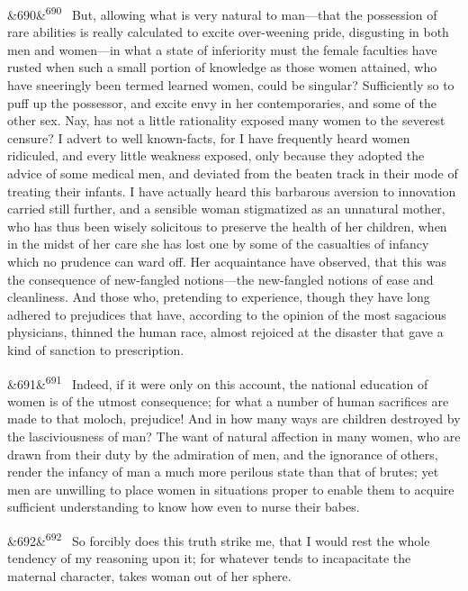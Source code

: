 \documentclass[12pt]{article}
\newcommand{\para}[1][]{\par\noindent\ifx&#1&\else\textsuperscript{\footnotesize #1}~\fi}
\begin{document}
\para[690] But, allowing what is very natural to man---that the possession of rare abilities is really calculated to excite over-weening pride, disgusting in both men and women---in what a state of inferiority must the female faculties have rusted when such a small portion of knowledge as those women attained, who have sneeringly been termed learned women, could be singular? Sufficiently so to puff up the possessor, and excite envy in her contemporaries, and some of the other sex. Nay, has not a little rationality exposed many women to the severest censure? I advert to well known-facts, for I have frequently heard women ridiculed, and every little weakness exposed, only because they adopted the advice of some medical men, and deviated from the beaten track in their mode of treating their infants. I have actually heard this barbarous aversion to innovation carried still further, and a sensible woman stigmatized as an unnatural mother, who has thus been wisely solicitous to preserve the health of her children, when in the midst of her care she has lost one by some of the casualties of infancy which no prudence can ward off. Her acquaintance have observed, that this was the consequence of new-fangled notions---the new-fangled notions of ease and cleanliness. And those who, pretending to experience, though they have long adhered to prejudices that have, according to the opinion of the most sagacious physicians, thinned the human race, almost rejoiced at the disaster that gave a kind of sanction to prescription.

\para[691] Indeed, if it were only on this account, the national education of women is of the utmost consequence; for what a number of human sacrifices are made to that moloch, prejudice! And in how many ways are children destroyed by the lasciviousness of man? The want of natural affection in many women, who are drawn from their duty by the admiration of men, and the ignorance of others, render the infancy of man a much more perilous state than that of brutes; yet men are unwilling to place women in situations proper to enable them to acquire sufficient understanding to know how even to nurse their babes.

\para[692] So forcibly does this truth strike me, that I would rest the whole tendency of my reasoning upon it; for whatever tends to incapacitate the maternal character, takes woman out of her sphere.
\end{document}
